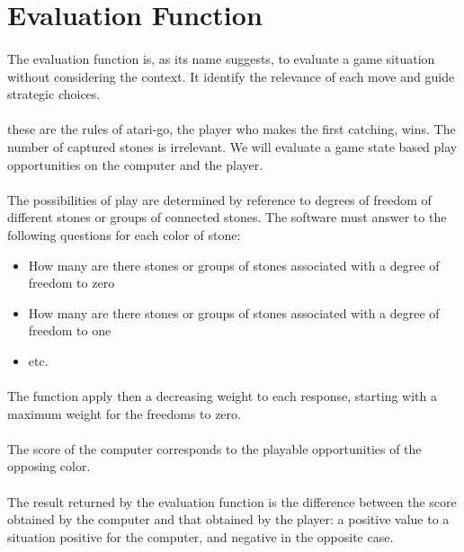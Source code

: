 \documentclass[a4paper,12pt]{report}
\begin{document}
      \section{Evaluation Function}
	  \paragraph*{}
	  The evaluation function is, as its name suggests, to evaluate a game situation without considering the context.
	  It identify the relevance of each move and guide strategic choices.
	  \paragraph*{}
	  these are the rules of atari-go, the player who makes the first catching, wins.
	  The number of captured stones is irrelevant. We will evaluate a game state based play opportunities on the computer and the player.
	  \paragraph*{}
	  The possibilities of play are determined by reference to degrees of freedom of different stones or groups of connected stones.
	  The software must answer to the following questions for each color of stone:
	  \begin{itemize}
	   \item How many are there stones or groups of stones associated with a degree of freedom to zero
	   \item How many are there stones or groups of stones associated with a degree of freedom to one
	   \item etc.
	  \end{itemize}
	  \paragraph*{}
	  The function apply then a decreasing weight to each response, starting with a maximum weight for the freedoms to zero.
	  \paragraph*{}
	   The score of the computer corresponds to the playable opportunities of the opposing color.
	  \paragraph*{}
	  The result returned by the evaluation function is the difference between the score obtained by the computer and that obtained by the player:
	  a positive value to a situation positive for the computer, and negative in the opposite case.
	  
\end{document}

